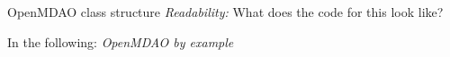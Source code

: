 \begin{frame}{OpenMDAO class structure}
  \emph{Readability:} What does the code for this look like?

  \pause
  \vspace{\baselineskip}

  In the following: \emph{OpenMDAO by example}
\end{frame}
